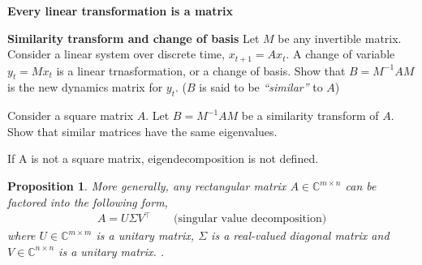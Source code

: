 \documentclass[a4paper,11pt]{exam}
\newtheorem{proposition}[theorem]{Proposition}
\newcounter{ct}
\newcommand{\inv}{^{-1}}
\newcommand{\trp}{{^\top}} %
\newcommand{\norm}[1]{\ensuremath{\Vert{#1}\Vert}}
\newcommand{\field}[1]{\ensuremath{\mathbb{#1}}}
\newcommand{\reals}{\field{R}}
\newcommand{\complex}{\field{C}}
\newcommand{\funfact}{\textbf{Fun Fact:}~}
\begin{document}
\begin{questions}

\question \textbf{Every linear transformation is a matrix}

\question \textbf{Similarity transform and change of basis}
Let $M$ be any invertible matrix.
Consider a linear system over discrete time, $x_{t+1} = Ax_t$.
A change of variable $y_t = Mx_t$ is a linear trnasformation, or a change of basis.
Show that $B = M\inv A M$ is the new dynamics matrix for $y_t$.
($B$ is said to be \textit{``similar''} to $A$)

\question Consider a square matrix $A$. Let $B = M\inv A M$ be a similarity transform of $A$.
Show that similar matrices have the same eigenvalues.

If A is not a square matrix, eigendecomposition is not defined. 

\begin{proposition}
    More generally, any rectangular matrix $A \in \complex^{m \times n}$ can be factored into the following form,
    \begin{align}\label{eq:eig}
        A = U \Sigma V\trp \qquad \text{(singular value decomposition)}
    \end{align}
    where $U\in \complex^{m \times m}$ is a unitary matrix, $\Sigma$ is a real-valued diagonal matrix and
    $V\in \complex^{n \times n}$ is a unitary matrix.
    .
\end{proposition}


\end{questions}
\end{document}
